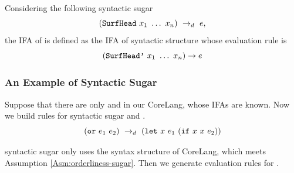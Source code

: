 \begin{Def}
\label{def:ifa-sugar}
Considering the following syntactic sugar
\[
(\mbox{\tt SurfHead}~x_1~\ldots~x_n) ~\rightarrow_d~ e,
\]
the IFA of  is defined as the IFA of syntactic structure  whose evaluation rule is
\[
(\mbox{\tt SurfHead'}~x_1~\ldots~x_n) \to e
\]

\end{Def}

\subsubsection{An Example of Syntactic Sugar}

Suppose that there are only  and  in our CoreLang, whose IFAs are known. Now we build rules for syntactic sugar  and .
\[
(\mbox{\tt or}~e_1~e_2) ~\rightarrow_d~ (\mbox{\tt let}~x~e_1~(\mbox{\tt if}~x~x~e_2))
\]

 syntactic sugar only uses the syntax structure of CoreLang, which meets Assumption \ref{Asm:orderliness-sugar}. Then we generate evaluation rules for .

